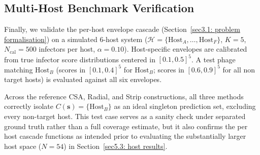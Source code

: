 

\newpage

\subsection{Multi-Host Benchmark Verification}
\label{sec5.1.4: multi host validation}

Finally, we validate the per-host envelope cascade (Section~\ref{sec3.1: problem formalisation}) on a simulated 
6-host system ($\mathcal{H} = \{\text{Host}_A, \dots, \text{Host}_F\}$, $K=5$, $N_{\text{cal}} = 500$ infectors per host, 
$\alpha = 0.10$). Host-specific envelopes are calibrated from true infector score distributions centered in $[0.1, 0.5]^5$. 
A test phage matching $\text{Host}_B$ (scores in $[0.1, 0.4]^5$ for $\text{Host}_B$; scores in $[0.6, 0.9]^5$ for all non 
target hosts) is evaluated against all six envelopes.

Across the reference CSA, Radial, and Strip constructions, all three methods correctly isolate $C(\mathbf{s}) = 
\{\text{Host}_B\}$ as an ideal singleton prediction set, excluding every non-target host. This test case serves as a sanity 
check under separated ground truth rather than a full coverage estimate, but it also confirms the per host cascade 
functions as intended prior to evaluating the substantially larger host space ($N=54$) in Section~\ref{sec5.3: host results}.





